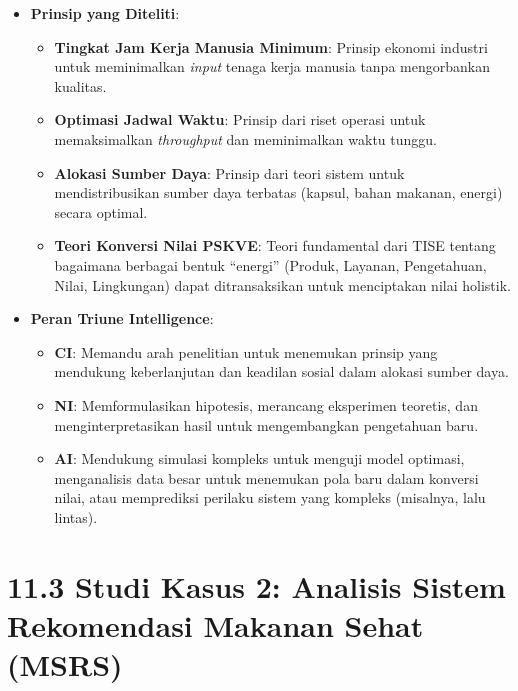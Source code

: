\documentclass[
  letterpaper,
  DIV=11,
  numbers=noendperiod]{scrreprt}
\providecommand{\tightlist}{%
  \setlength{\itemsep}{0pt}\setlength{\parskip}{0pt}}
\begin{document}
\begin{itemize}
  \begin{itemize}
  \tightlist
  \item
    \textbf{Prinsip yang Diteliti}:

    \begin{itemize}
    \tightlist
    \item
      \textbf{Tingkat Jam Kerja Manusia Minimum}: Prinsip ekonomi
      industri untuk meminimalkan \emph{input} tenaga kerja manusia
      tanpa mengorbankan kualitas.
    \item
      \textbf{Optimasi Jadwal Waktu}: Prinsip dari riset operasi untuk
      memaksimalkan \emph{throughput} dan meminimalkan waktu tunggu.
    \item
      \textbf{Alokasi Sumber Daya}: Prinsip dari teori sistem untuk
      mendistribusikan sumber daya terbatas (kapsul, bahan makanan,
      energi) secara optimal.
    \item
      \textbf{Teori Konversi Nilai PSKVE}: Teori fundamental dari TISE
      tentang bagaimana berbagai bentuk ``energi'' (Produk, Layanan,
      Pengetahuan, Nilai, Lingkungan) dapat ditransaksikan untuk
      menciptakan nilai holistik.
    \end{itemize}
  \item
    \textbf{Peran Triune Intelligence}:

    \begin{itemize}
    \tightlist
    \item
      \textbf{CI}: Memandu arah penelitian untuk menemukan prinsip yang
      mendukung keberlanjutan dan keadilan sosial dalam alokasi sumber
      daya.
    \item
      \textbf{NI}: Memformulasikan hipotesis, merancang eksperimen
      teoretis, dan menginterpretasikan hasil untuk mengembangkan
      pengetahuan baru.
    \item
      \textbf{AI}: Mendukung simulasi kompleks untuk menguji model
      optimasi, menganalisis data besar untuk menemukan pola baru dalam
      konversi nilai, atau memprediksi perilaku sistem yang kompleks
      (misalnya, lalu lintas).
    \end{itemize}
  \end{itemize}
\end{itemize}

\section{\texorpdfstring{\textbf{11.3 Studi Kasus 2: Analisis Sistem
Rekomendasi Makanan Sehat
(MSRS)}}{11.3 Studi Kasus 2: Analisis Sistem Rekomendasi Makanan Sehat (MSRS)}}\label{studi-kasus-2-analisis-sistem-rekomendasi-makanan-sehat-msrs}
\end{document}
